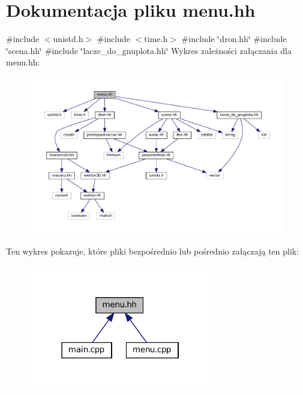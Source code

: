 \hypertarget{menu_8hh}{}\section{Dokumentacja pliku menu.\+hh}
\label{menu_8hh}
{\ttfamily \#include $<$unistd.\+h$>$}\newline
{\ttfamily \#include $<$time.\+h$>$}\newline
{\ttfamily \#include \char`\"{}dron.\+hh\char`\"{}}\newline
{\ttfamily \#include \char`\"{}scena.\+hh\char`\"{}}\newline
{\ttfamily \#include \char`\"{}lacze\+\_\+do\+\_\+gnuplota.\+hh\char`\"{}}\newline
Wykres zależności załączania dla menu.\+hh\+:\nopagebreak
\begin{figure}[H]
\begin{center}
\leavevmode
\includegraphics[width=350pt]{menu_8hh__incl}
\end{center}
\end{figure}
Ten wykres pokazuje, które pliki bezpośrednio lub pośrednio załączają ten plik\+:\nopagebreak
\begin{figure}[H]
\begin{center}
\leavevmode
\includegraphics[width=226pt]{menu_8hh__dep__incl}
\end{center}
\end{figure}
